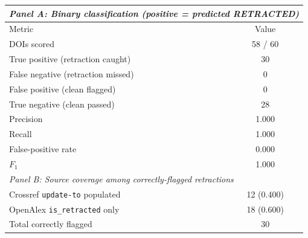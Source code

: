 \begin{tabular}{lc}
\toprule
\multicolumn{2}{l}{\textit{Panel A: Binary classification (positive = predicted RETRACTED)}} \\
\midrule
 Metric & Value \\
\midrule
 DOIs scored & 58 / 60 \\
 True positive (retraction caught) & 30 \\
 False negative (retraction missed) & 0 \\
 False positive (clean flagged) & 0 \\
 True negative (clean passed) & 28 \\
\midrule
 Precision & 1.000 \\
 Recall & 1.000 \\
 False-positive rate & 0.000 \\
 $F_1$ & 1.000 \\
\midrule
\multicolumn{2}{l}{\textit{Panel B: Source coverage among correctly-flagged retractions}} \\
\midrule
 Crossref \texttt{update-to} populated & 12 (0.400) \\
 OpenAlex \texttt{is\_retracted} only & 18 (0.600) \\
 Total correctly flagged & 30 \\
\bottomrule
\end{tabular}
